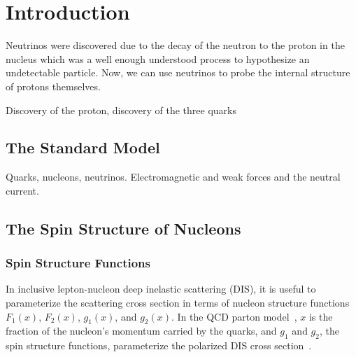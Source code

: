 \section{Introduction} \label{sec:intro}
\hspace{\parindent}

Neutrinos were discovered due to the decay of the neutron to the proton in the nucleus which was a well enough understood process to hypothesize an undetectable particle.
Now,  we can use neutrinos to probe the internal structure of protons themselves.

Discovery of the proton, discovery of the three quarks

\subsection{The Standard Model}\label{sec:standardmodel}

Quarks, nucleons, neutrinos. Electromagnetic and weak forces and the neutral
current.


\subsection{The Spin Structure of Nucleons} \label{sec:nuctheory}

  \subsubsection{Spin Structure Functions}
  In inclusive lepton-nucleon deep inelastic scattering (DIS), it is useful to
  parameterize the scattering cross section in terms of nucleon structure
  functions $F_1(x)$, $F_2(x)$, $g_1(x)$, and $g_2(x)$. In the QCD parton
  model~\cite{Feynman:1969wa}, $x$ is the fraction of the nucleon's momentum
  carried by the quarks, and $g_1$ and $g_2$, the spin structure functions,
  parameterize the polarized DIS cross section~\cite{Thomas:2001kw}.

